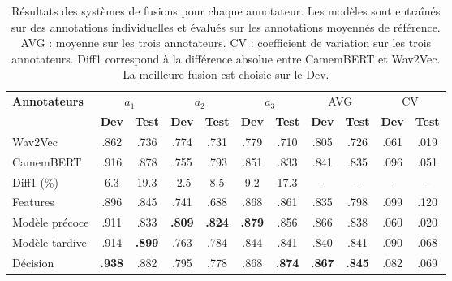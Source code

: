 \begin{table}[h]
    \centering
    \begin{tabular}{|l |cc| cc | cc | cc | cc|}\hline
     \textbf{Annotateurs} & \multicolumn{2}{c|}{$a_1$} & \multicolumn{2}{c|}{$a_2$}  &\multicolumn{2}{c|}{$a_3$} &\multicolumn{2}{c|}{AVG} & \multicolumn{2}{c|}{CV}\\
      & \textbf{Dev} &\textbf{Test} &\textbf{Dev}  &\textbf{Test} & \textbf{Dev} &\textbf{Test} & \textbf{Dev} &\textbf{Test}  & \textbf{Dev} &\textbf{Test}\\ \hline

     Wav2Vec    & .862 & .736 & .774 & .731 & .779 & .710 & .805 & .726 & .061 & .019\\
     CamemBERT  & .916 & .878 & .755 & .793 & .851 & .833 & .841 & .835 & .096 & .051\\
     Diff1 (\%)           & 6.3 & 19.3 & -2.5 & 8.5 & 9.2 & 17.3 & - & - & - & -\\
     \hline
     Features           & .896 & .845 & .741 & .688 & .868 & .861 & .835 & .798 & .099 & .120 \\
     \hline
     Modèle précoce     & .911 & .833 & \textbf{.809} & \textbf{.824} & \textbf{.879} & .856 & .866 & .838 & .060 & .020\\
     Modèle tardive      & .914 & \textbf{.899} & .763 & .784 & .844 & .841 & .840 & .841 & .090 & .068\\
     \hline
     Décision           & \textbf{.938} & .882 & .795 & .778 & .868 & \textbf{.874} & \textbf{.867} & \textbf{.845} & .082 & .069 \\
     \hline

    \end{tabular}
    \caption{Résultats des systèmes de fusions pour chaque annotateur. Les modèles sont entraînés sur des annotations individuelles et évalués sur les annotations moyennés de référence. AVG : moyenne sur les trois annotateurs. CV : coefficient de variation sur les trois annotateurs. Diff1 correspond à la différence absolue entre CamemBERT et Wav2Vec. La meilleure fusion est choisie sur le Dev.}
    \label{tab:by_annotator}
\end{table}
